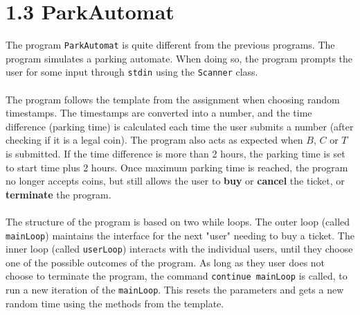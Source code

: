 \section*{1.3 ParkAutomat}

The program \texttt{ParkAutomat} is quite different from the previous programs. The program simulates a parking automate. When doing so, the program prompts the user for some input through \texttt{stdin} using the \texttt{Scanner} class. \\
\\
The program follows the template from the assignment when choosing random timestamps. The timestamps are converted into a number, and the time difference (parking time) is calculated each time the user submits a number (after checking if it is a legal coin). The program also acts as expected when $B$, $C$ or $T$ is submitted. If the time difference is more than 2 hours, the parking time is set to start time plus 2 hours. Once maximum parking time is reached, the program no longer accepts coins, but still allows the user to \textbf{buy} or \textbf{cancel} the ticket, or \textbf{terminate} the program.\\
\\
The structure of the program is based on two while loops. The outer loop (called \texttt{mainLoop}) maintains the interface for the next "user" needing to buy a ticket. The inner loop (called \texttt{userLoop}) interacts with the individual users, until they choose one of the possible outcomes of the program. As long as they user does not choose to terminate the program, the command \texttt{continue mainLoop} is called, to run a new iteration of the  \texttt{mainLoop}. This resets the parameters and gets a new random time using the methods from the template.